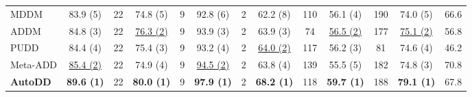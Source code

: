 \documentclass[conference]{IEEEtran}
\begin{document}
\begin{table}[p]
{\begin{tabular}{|l|c|c|c|c|c|c|c|c|c|c|c|c|}
MDDM & 83.9 (5) & 22 & 74.8 (5) & 9 & 92.8 (6) & 2 & 62.2 (8) & 110 & 56.1 (4) & 190 & 74.0 (5) & 66.6 \\
ADDM & 84.8 (3) & 22 & \underline{76.3 (2)} & 9 & 93.9 (3) & 2 & 63.9 (3) & 74 & \underline{56.5 (2)} & 177 & \underline{75.1 (2)} & 56.8 \\
PUDD & 84.4 (4) & 22 & 75.4 (3) & 9 & 93.2 (4) & 2 & \underline{64.0 (2)} & 117 & 56.2 (3) & 81 & 74.6 (4) & 46.2 \\
Meta-ADD & \underline{85.4 (2)} & 22 & 74.9 (4) & 9 & \underline{94.5 (2)} & 2 & 63.8 (4) & 139 & 55.5 (5) & 182 & 74.8 (3) & 70.8 \\
\textbf{AutoDD} & \textbf{89.6 (1)} & 22 & \textbf{80.0 (1)} & 9 & \textbf{97.9 (1)} & 2 & \textbf{68.2 (1)} & 118 & \textbf{59.7 (1)} & 188 & \textbf{79.1 (1)} & 67.8 \\
\hline
\end{tabular}
}

\vspace{1em}


\end{table}
\end{document}

